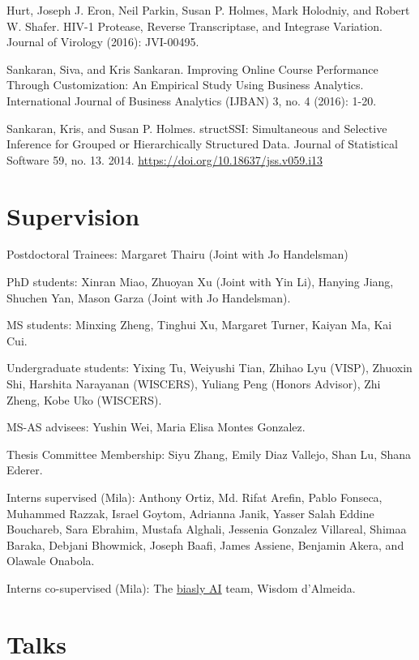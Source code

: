 \documentclass[letterpaper]{article}
\renewenvironment{itemize}{
  \begin{list}{}{
    \setlength{\leftmargin}{1.5em}
  }
}{
  \end{list}
}
\begin{document}
\begin{itemize}
    Hurt, Joseph J. Eron, Neil Parkin, Susan P. Holmes, Mark Holodniy, and Robert
    W. Shafer. HIV-1 Protease, Reverse Transcriptase, and Integrase Variation.
    Journal of Virology (2016): JVI-00495.
  \item Sankaran, Siva, and Kris Sankaran. Improving Online Course Performance
    Through Customization: An Empirical Study Using Business Analytics.
    International Journal of Business Analytics (IJBAN) 3, no. 4 (2016): 1-20.
\item Sankaran, Kris, and Susan P. Holmes. structSSI: Simultaneous and Selective
  Inference for Grouped or Hierarchically Structured Data. Journal of
  Statistical Software 59, no. 13. 2014. \href{https://doi.org/10.18637/jss.v059.i13}{https://doi.org/10.18637/jss.v059.i13}
\end{itemize}
\section*{Supervision}
\begin{itemize}
\item Postdoctoral Trainees: Margaret Thairu (Joint with Jo Handelsman)
\item PhD students: Xinran Miao, Zhuoyan Xu (Joint with Yin Li), Hanying Jiang,
Shuchen Yan, Mason Garza (Joint with Jo Handelsman).
\item MS students: Minxing Zheng, Tinghui Xu, Margaret Turner, Kaiyan Ma, Kai
Cui.
\item Undergraduate students: Yixing Tu, Weiyushi Tian, Zhihao Lyu (VISP),
  Zhuoxin Shi, Harshita Narayanan (WISCERS), Yuliang Peng (Honors Advisor), Zhi
  Zheng, Kobe Uko (WISCERS).
\item MS-AS advisees: Yushin Wei, Maria Elisa Montes Gonzalez.
\item Thesis Committee Membership: Siyu Zhang, Emily Diaz Vallejo, Shan Lu,
Shana Ederer.
\item Interns supervised (Mila): Anthony Ortiz, Md. Rifat Arefin, Pablo Fonseca,
  Muhammed Razzak, Israel Goytom, Adrianna Janik, Yasser Salah Eddine Bouchareb,
  Sara Ebrahim, Mustafa Alghali, Jessenia Gonzalez Villareal, Shimaa Baraka,
  Debjani Bhowmick, Joseph Baafi, James Assiene, Benjamin Akera, and Olawale
  Onabola.
\item Interns co-supervised (Mila): The
\href{https://sites.google.com/view/biaslyai/home}{biasly AI} team, Wisdom
d'Almeida.
\end{itemize}

\section*{Talks}
\end{document}
